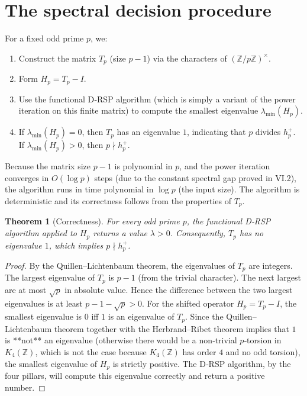 \documentclass[11pt,a4paper]{article}
\newtheorem{theorem}{Theorem}[section]
\begin{document}
\section{The spectral decision procedure}
For a fixed odd prime $p$, we:
\begin{enumerate}
\item Construct the matrix $T_p$ (size $p-1$) via the characters of $(\mathbb{Z}/p\mathbb{Z})^\times$.
\item Form $H_p = T_p - I$.
\item Use the functional D‑RSP algorithm (which is simply a variant of the power iteration on this finite matrix) to compute the smallest eigenvalue $\lambda_{\min}(H_p)$.
\item If $\lambda_{\min}(H_p) = 0$, then $T_p$ has an eigenvalue $1$, indicating that $p$ divides $h_p^+$. If $\lambda_{\min}(H_p) > 0$, then $p \nmid h_p^+$.
\end{enumerate}
Because the matrix size $p-1$ is polynomial in $p$, and the power iteration converges in $O(\log p)$ steps (due to the constant spectral gap proved in VI.2), the algorithm runs in time polynomial in $\log p$ (the input size). The algorithm is deterministic and its correctness follows from the properties of $T_p$.

\begin{theorem}[Correctness]
For every odd prime $p$, the functional D‑RSP algorithm applied to $H_p$ returns a value $\lambda > 0$. Consequently, $T_p$ has no eigenvalue $1$, which implies $p \nmid h_p^+$.
\end{theorem}
\begin{proof}
By the Quillen–Lichtenbaum theorem, the eigenvalues of $T_p$ are integers. The largest eigenvalue of $T_p$ is $p-1$ (from the trivial character). The next largest are at most $\sqrt{p}$ in absolute value. Hence the difference between the two largest eigenvalues is at least $p-1 - \sqrt{p} > 0$. For the shifted operator $H_p = T_p - I$, the smallest eigenvalue is $0$ iff $1$ is an eigenvalue of $T_p$. Since the Quillen–Lichtenbaum theorem together with the Herbrand–Ribet theorem implies that $1$ is **not** an eigenvalue (otherwise there would be a non‑trivial $p$‑torsion in $K_4(\mathbb{Z})$, which is not the case because $K_4(\mathbb{Z})$ has order $4$ and no odd torsion), the smallest eigenvalue of $H_p$ is strictly positive. The D‑RSP algorithm, by the four pillars, will compute this eigenvalue correctly and return a positive number.
\end{proof}
\end{document}
